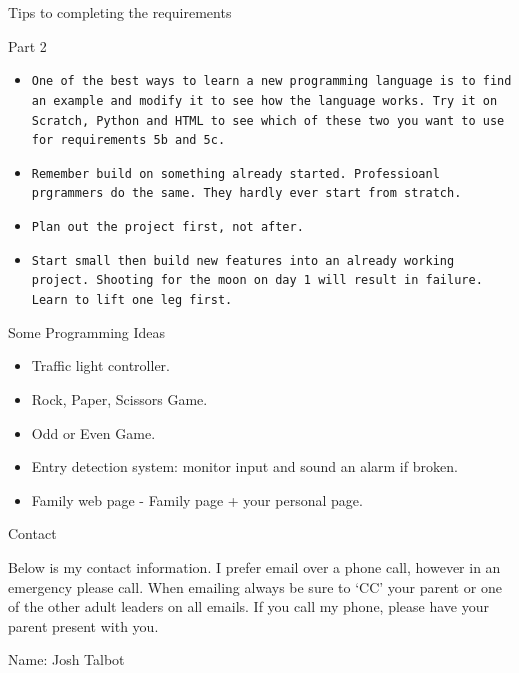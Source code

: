 \documentclass[10pt]{beamer}
\begin{document}
{\begin{frame}{Tips to completing the requirements}{}
\begin{block}{Part 2}
  \begin{itemize}
    \item {\tt One of the best ways to learn a new programming language is to find an example and modify it to see how the language works.  Try it on Scratch, Python and HTML to see which of these two you want to use for requirements 5b and 5c.}
    \item {\tt Remember build on something already started.  Professioanl prgrammers do the same.  They hardly ever start from stratch.}
    \item {\tt Plan out the project first, not after. }
    \item {\tt Start small then build new features into an already working project.  Shooting for the moon on day 1 will result in failure.  Learn to lift one leg first. }
    \end{itemize}
  \end{block}
\end{frame}


\begin{frame}{Some Programming Ideas}{}
\begin{block}{}
  \begin{itemize}
    \item Traffic light controller.
    \item Rock, Paper, Scissors Game.
    \item Odd or Even Game.
    \item Entry detection system: monitor input and sound an alarm if broken.
    \item Family web page - Family page + your personal page.
    \end{itemize}
  \end{block}
\end{frame}


\begin{frame}{Contact}{}
\begin{block}{}
Below is my contact information.  I prefer email over a phone call, however in an emergency please call.  When emailing always be sure to `CC' your parent or one of the other adult leaders on all emails.  If you call my phone, please have your parent present with you.
\end{block}
\begin{block}{}
Name: Josh Talbot


\end{block}
\end{frame}}
\end{document}
